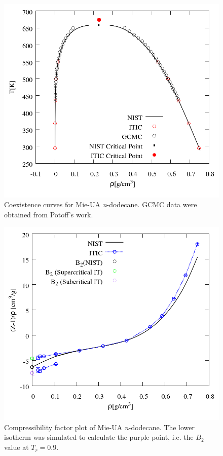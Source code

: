 \documentclass[5p,times]{elsarticle}
\begin{document}
\begin{figure}
\includegraphics[scale=0.30]{Figures/EXAMPLE-SIM_Mie-C12_trho.png}
\caption{Coexistence curves for Mie-UA \textit{n}-dodecane. GCMC data were obtained from Potoff's work\cite{Potoff2009}.}
\label{fig:EXAMPLE-SIM/Mie-C12/T_rho}
\end{figure}

\begin{figure}
\includegraphics[scale=0.30]{Figures/EXAMPLE-SIM_Mie-C12_zrho.png}
\caption{Compressibility factor plot of Mie-UA \textit{n}-dodecane. The lower isotherm was simulated to calculate the purple point, i.e. the $B_2$ value at $T_r=0.9$.}
\label{fig:EXAMPLE-SIM/Mie-C12/Z_rho}
\end{figure}
\end{document}

